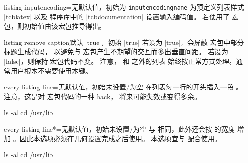 \clearpage
\begin{docTcbKey}{listing inputencoding}{=}{无默认值，初始为 \texttt{\cs inputencodingname}}
  为预定义列表样式 |tcblatex| 以及  程序库中的
  |tcbdocumentation| 设置输入编码值。
  若使用了  宏包，则初始值由该宏包推导得出。
\end{docTcbKey}

\begin{docTcbKey}{listing remove caption}{}{默认 |true|，初始 |true|}
若设为 |true|，会屏蔽  宏包中部分标题生成代码，
以避免与  宏包产生不期望的交互而多出垂直间距。
若设为 |false|，则保持  宏包代码不变。
注意， 和  之外的列表
始终按正常方式处理。通常用户根本不需要使用本键。
\end{docTcbKey}

\begin{docTcbKey}{every listing line}{=}{无默认值，初始未设置/为空}
在列表每一行的开头插入一段 。
注意，这是对  宏包代码的一种 hack，
将来可能失效或变得多余。
\begin{dispExample}

\begin{commandshell}
ls -al
cd /usr/lib
\end{commandshell}
\end{dispExample}
\end{docTcbKey}


\begin{docTcbKey}{every listing line*}{=}{无默认值，初始未设置/为空}
与  相同，此外还会按  的宽度
增加 。因此本选项必须在几何设置完成之后使用。
本选项宜与  配合使用。

\begin{dispExample}

\begin{commandshell}
ls -al
cd /usr/lib
\end{commandshell}
\end{dispExample}
\end{docTcbKey}

